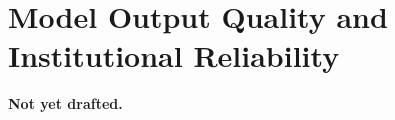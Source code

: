 \section{Model Output Quality and Institutional Reliability}
\label{sec:reliability}


\textbf{Not yet drafted.}
